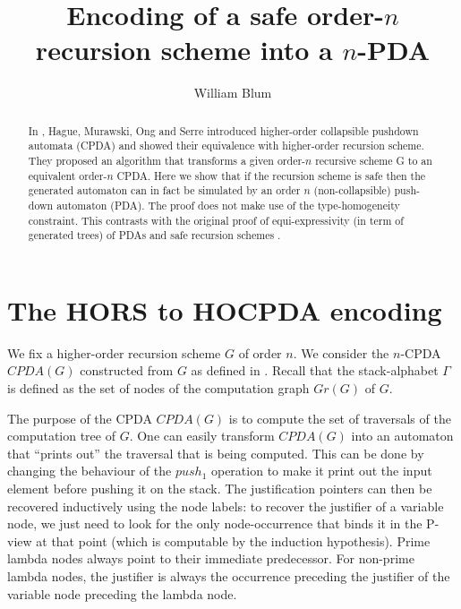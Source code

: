 \documentclass[a4paper]{article}
\author{William Blum}
\title{Encoding of a safe order-$n$ recursion scheme into a $n$-PDA}
\theoremstyle{remark}
\theoremstyle{definition}
\begin{document}
\maketitle
{}

\begin{abstract}
In \cite{hague-sto07}, Hague, Murawski, Ong and Serre introduced
higher-order collapsible pushdown automata (CPDA) and showed their
equivalence with higher-order recursion scheme. They proposed an
algorithm that transforms a given order-$n$ recursive  scheme G to
an equivalent order-$n$ CPDA. Here we show that if the recursion
scheme is safe then the generated automaton can in fact be simulated by an order
$n$ (non-collapsible) push-down automaton (PDA). The proof does not make
use of the type-homogeneity constraint. This contrasts with the original proof
of equi-expressivity (in term of generated trees) of PDAs and safe recursion schemes \cite{KNU02}.
\end{abstract}




\section{The HORS to HOCPDA encoding}

We fix a higher-order recursion scheme $G$ of order $n$.
We consider the $n$-CPDA $CPDA(G)$ constructed from $G$ as defined in \cite[Definition 5.2]{hague-sto07}.
Recall that the stack-alphabet $\Gamma$ is defined as the set of nodes of the computation graph $Gr(G)$ of $G$.

The purpose of the CPDA $CPDA(G)$ is to compute the set of traversals of the computation tree of $G$. One can easily transform $CPDA(G)$ into an automaton that ``prints out'' the traversal that is being computed. This can be done by changing the behaviour of the $push_1$ operation to make it print out the input element before pushing it on the stack. The justification pointers can then be recovered
inductively using the node labels: to recover the justifier of a variable node, we just need to look for the only node-occurrence that binds it in the P-view at that point (which is computable by the induction hypothesis).
Prime lambda nodes always point to their immediate predecessor. For non-prime lambda nodes, the justifier is always the occurrence preceding the justifier of the variable node preceding the lambda node.
\end{document}
